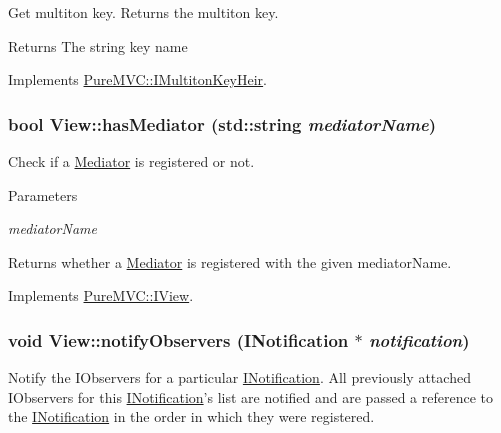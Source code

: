 Get multiton key. Returns the multiton key. \begin{DoxyReturn}{Returns}
The string key name 
\end{DoxyReturn}


Implements \hyperlink{class_pure_m_v_c_1_1_i_multiton_key_heir_aecccfb9898368c6377550ceae5730934}{PureMVC::IMultitonKeyHeir}.\hypertarget{class_pure_m_v_c_1_1_view_a5af9aeea286647436cf595d0a946711f}{
\subsubsection[{hasMediator}]{\setlength{\rightskip}{0pt plus 5cm}bool View::hasMediator (std::string {\em mediatorName})}}
\label{class_pure_m_v_c_1_1_view_a5af9aeea286647436cf595d0a946711f}


Check if a \hyperlink{class_pure_m_v_c_1_1_mediator}{Mediator} is registered or not. 
\begin{DoxyParams}{Parameters}
\item[{\em mediatorName}]\end{DoxyParams}
\begin{DoxyReturn}{Returns}
whether a \hyperlink{class_pure_m_v_c_1_1_mediator}{Mediator} is registered with the given {\ttfamily mediatorName}. 
\end{DoxyReturn}


Implements \hyperlink{class_pure_m_v_c_1_1_i_view_a04387bea6dd82b8a34ea47b51938ccc5}{PureMVC::IView}.\hypertarget{class_pure_m_v_c_1_1_view_a515953a4f2e9c6b7a29ae0591657b9f3}{
\subsubsection[{notifyObservers}]{\setlength{\rightskip}{0pt plus 5cm}void View::notifyObservers ({\bf INotification} $\ast$ {\em notification})}}
\label{class_pure_m_v_c_1_1_view_a515953a4f2e9c6b7a29ae0591657b9f3}


Notify the {\ttfamily IObservers} for a particular {\ttfamily \hyperlink{class_pure_m_v_c_1_1_i_notification}{INotification}}. All previously attached {\ttfamily IObservers} for this {\ttfamily \hyperlink{class_pure_m_v_c_1_1_i_notification}{INotification}}'s list are notified and are passed a reference to the {\ttfamily \hyperlink{class_pure_m_v_c_1_1_i_notification}{INotification}} in the order in which they were registered.


